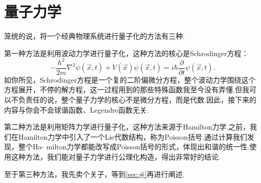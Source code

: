 \section{量子力学}\label{sec:QM}
		
    笼统的说，将一个经典物理系统进行量子化的方法有三种.
    
    第一种方法是利用波动力学进行量子化，这种方法的核心是Schrodinger方程：
    \begin{equation}
        -\frac{\hbar^2}{2m}\nabla^2\psi(\overrightarrow{x},t)+V(\overrightarrow{x})\psi(\overrightarrow{x},t)=i\hbar\frac{\partial}{\partial t}\psi(\overrightarrow{x},t).
    \end{equation}
    如你所见，Schrodinger方程是一个复的二阶偏微分方程，整个波动力学围绕这个方程展开，不停的解方程，这一过程用到的那些特殊函数我至今没有弄懂.但我可以不负责任的说，整个量子力学的核心不是微分方程，而是代数.因此，接下来的内容与你会不会球谐函数、Legendre函数无关.

    第二种方法是利用矩阵力学进行量子化，这种方法来源于Hamilton力学.之前，我们在Hamilton力学中引入了一个Lie代数结构，称为Poisson括号.通过计算我们发现，整个Ha-
    milton力学都能改写成Poisson括号的形式，体现出和谐的统一性.使用这种方法，我们能对量子力学进行公理化构造，得出非常好的结论.

    至于第三种方法，我先卖个关子，等到\ref{sec:#}再进行阐述.

